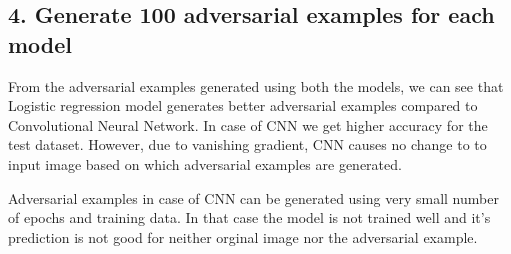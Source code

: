\documentclass[11pt]{article}
\begin{document}
    \subsection{4. Generate 100 adversarial examples for each
model}\label{generate-100-adversarial-examples-for-each-model}

    From the adversarial examples generated using both the models, we can
see that Logistic regression model generates better adversarial examples
compared to Convolutional Neural Network. In case of CNN we get higher
accuracy for the test dataset. However, due to vanishing gradient, CNN
causes no change to to input image based on which adversarial examples
are generated.

Adversarial examples in case of CNN can be generated using very small
number of epochs and training data. In that case the model is not
trained well and it's prediction is not good for neither orginal image
nor the adversarial example.
\end{document}
